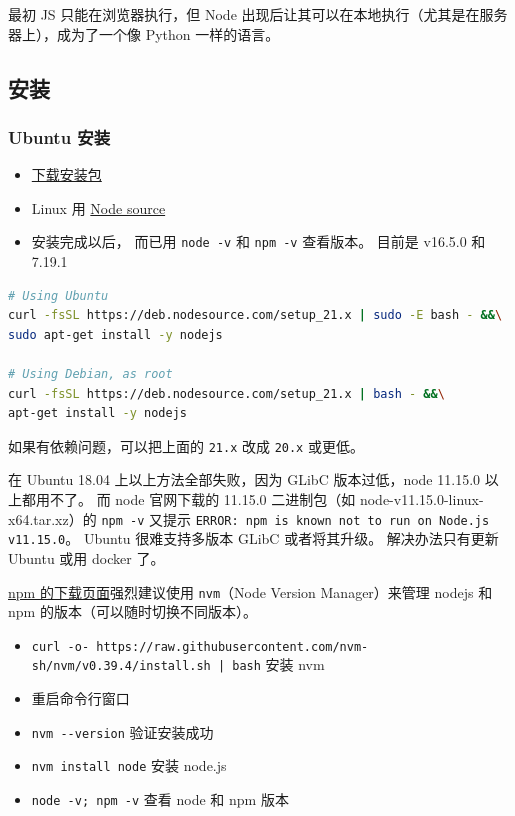 

最初 JS 只能在浏览器执行，但 Node 出现后让其可以在本地执行（尤其是在服务器上），成为了一个像 Python 一样的语言。

\subsection{安装}
\subsubsection{Ubuntu 安装}
\begin{itemize}
\item \href{https://nodejs.org/en/download/package-manager/}{下载安装包}
\item Linux 用 \href{https://github.com/nodesource/distributions/blob/master/README.md#installation-instructions}{Node source}
\item 安装完成以后， 而已用 \verb`node -v` 和 \verb`npm -v` 查看版本。 目前是 v16.5.0 和 7.19.1
\end{itemize}
\begin{lstlisting}[language=bash]
# Using Ubuntu
curl -fsSL https://deb.nodesource.com/setup_21.x | sudo -E bash - &&\
sudo apt-get install -y nodejs

# Using Debian, as root
curl -fsSL https://deb.nodesource.com/setup_21.x | bash - &&\
apt-get install -y nodejs
\end{lstlisting}
如果有依赖问题，可以把上面的 \verb`21.x` 改成 \verb`20.x` 或更低。

在 Ubuntu 18.04 上以上方法全部失败，因为 GLibC 版本过低，node 11.15.0 以上都用不了。 而 node 官网下载的 11.15.0 二进制包（如 node-v11.15.0-linux-x64.tar.xz）的 \verb`npm -v` 又提示 \verb`ERROR: npm is known not to run on Node.js v11.15.0`。 Ubuntu 很难支持多版本 GLibC 或者将其升级。 解决办法只有更新 Ubuntu 或用 docker 了。

\href{https://docs.npmjs.com/downloading-and-installing-node-js-and-npm}{npm 的下载页面}强烈建议使用 \verb`nvm`（Node Version Manager）来管理 nodejs 和 npm 的版本（可以随时切换不同版本）。
\begin{itemize}
\item \verb`curl -o- https://raw.githubusercontent.com/nvm-sh/nvm/v0.39.4/install.sh | bash` 安装 nvm
\item 重启命令行窗口
\item \verb`nvm --version` 验证安装成功
\item \verb`nvm install node` 安装 node.js
\item \verb`node -v; npm -v` 查看 node 和 npm 版本
\end{itemize}

